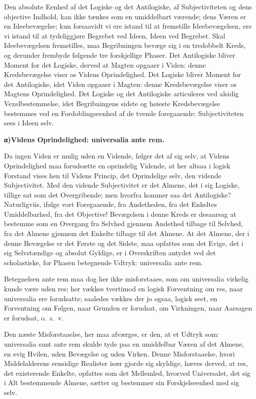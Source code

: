 \documentclass[12pt]{book}
\newcommand{\opage}[1]{\marginnote{\footnotesize\textit{[#1]}}}
\begin{document}
Den absolute Eenhed af det Logiske og det Antilogiske, af Subjectiviteten og dens objective
Indhold, kan ikke tænkes som en umiddelbart værende; dens Væren er en Ideebevægelse; kun
forsaavidt vi ere istand til at fremstille Ideebevægelsen, ere vi istand til at tydeliggjøre
Begrebet ved Ideen, Ideen ved Begrebet. Skal Ideebevægelsen fremstilles, maa Begribningen bevæge
sig i en tredobbelt Kreds, og derunder frembyde følgende tre forskjellige Phaser. Det
Antilogiske bliver Moment for det Logiske, derved at Magten opgaaer i Viden: denne
Kredsbevægelse viser os Videns Oprindelighed. Det Logiske bliver Moment for det Antilogiske, idet
Viden opgaaer i Magten: denne Kredsbevægelse viser os Magtens Oprindelighed. Det Logiske og det
Antilogiske articuleres ved alsidig Vexelbestemmelse, idet Begribningens sidste og høieste
Kredsbevægelse bestemmes ved en Fordoblingseenhed af de tvende foregaaende: Subjectiviteten sees
i Ideen selv.

\begin{center}{\bfseries α)\quad Videns Oprindelighed: universalia ante rem.}\end{center}

Da ingen Viden er mulig uden en Vidende, følger det af sig selv, at Videns Oprindelighed maa
forudsætte en oprindelig Vidende, at her altsaa i logisk Forstand vises hen til Videns Princip,
det Oprindelige selv, den vidende Subjectivitet. Med den vidende Subjectivitet er det Almene, det
i sig Logiske, tillige sat som det Overgribende; men hvorfra kommer saa det Antilogiske?
Naturligviis, ifølge vort Foregaaende, fra Andetheden, fra det Enkeltes Umiddelbarhed, fra det
Objective!
\opage{179} Bevægelsen i denne Kreds er desaarsag at bestemme som en Overgang fra Selvhed gjennem Andethed
tilbage til Selvhed, fra det Almene gjennem det Enkelte tilbage til det Almene. At det Almene,
der i denne Bevægelse er det Første og det Sidste, maa opfattes som det Evige, det i sig
Selvstændige og absolut Gyldige, er i Overskriften antydet ved det scholastiske, for Phasen
betegnende Udtryk: universalia ante rem.

Betegnelsen ante rem maa dog her ikke misforstaaes, som om universalia virkelig kunde være uden
res; her vækkes tvertimod en logisk Forventning om res, naar universalia ere forudsatte;
saaledes vækkes der jo ogsaa, logisk seet, en Forventning om Følgen, naar Grunden er forudsat, om
Virkningen, naar Aarsagen er forudsat, o.\ s.\ v.

Den næste Misforstaaelse, her maa afværges, er den, at et Udtryk som: universalia sunt ante rem
skulde tyde paa en umiddelbar Væren af det Almene, en evig Hvilen, uden Bevægelse og uden Virken.
Denne Misforstaaelse, hvori Middelalderens eensidige Realister især gjorde sig skyldige, hæves
derved, at res, det existerende Enkelte, opfattes som det Mellemled, hvorved Universalet, det sig
i Alt bestemmende Almene, sætter og bestemmer sin Forskjelseenhed med sig selv.
\end{document}
